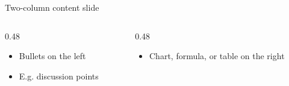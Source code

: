 
\begin{standardframe}{Two-column content slide}
	\begin{columns}[t,onlytextwidth]
		\begin{column}{0.48\linewidth}
			\begin{itemize}
				\item Bullets on the left
				\item E.g. discussion points
			\end{itemize}
		\end{column}
		\begin{column}{0.48\linewidth}
			\begin{itemize}
				\item Chart, formula, or table on the right
			\end{itemize}
		\end{column}
	\end{columns}
\end{standardframe}
